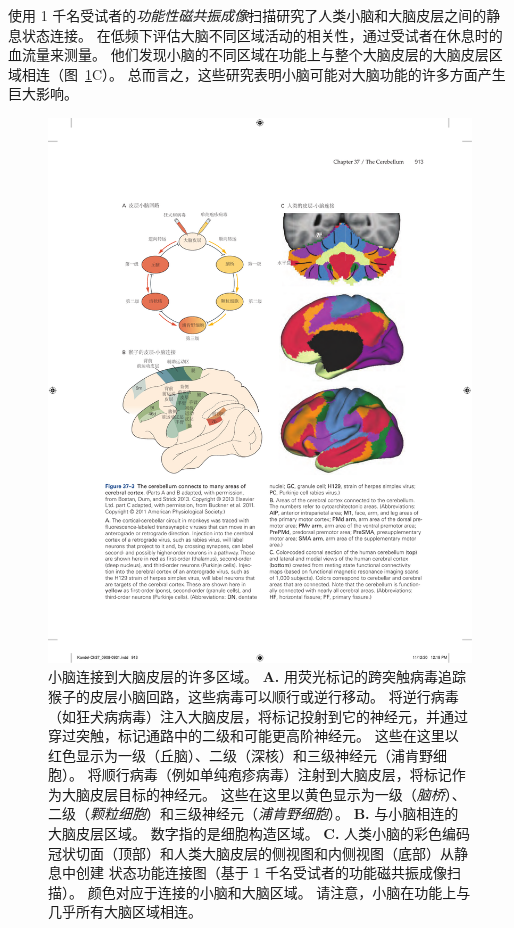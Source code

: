 使用 1 千名受试者的\textit{功能性磁共振成像}扫描研究了人类小脑和大脑皮层之间的静息状态连接。
在低频下评估大脑不同区域活动的相关性，通过受试者在休息时的血流量来测量。
他们发现小脑的不同区域在功能上与整个大脑皮层的大脑皮层区域相连（图~\ref{fig:37_3}C）。
总而言之，这些研究表明小脑可能对大脑功能的许多方面产生巨大影响。


\begin{figure}[htbp]
	\centering
	\includegraphics[width=1.0\linewidth]{chap37/fig_37_3}
	\caption{小脑连接到大脑皮层的许多区域\cite{bostan2013cerebellar}。
		\textbf{A.} 用荧光标记的跨突触病毒追踪猴子的皮层小脑回路，这些病毒可以顺行或逆行移动。
		将逆行病毒（如狂犬病病毒）注入大脑皮层，将标记投射到它的神经元，并通过穿过突触，标记通路中的二级和可能更高阶神经元。
		这些在这里以红色显示为一级（丘脑）、二级（深核）和三级神经元（浦肯野细胞）。
		将顺行病毒（例如单纯疱疹病毒）注射到大脑皮层，将标记作为大脑皮层目标的神经元。
		这些在这里以黄色显示为一级（\textit{脑桥}）、二级（\textit{颗粒细胞}）和三级神经元（\textit{浦肯野细胞}）。
		\textbf{B.} 与小脑相连的大脑皮层区域。 数字指的是细胞构造区域。
		\textbf{C.} 人类小脑的彩色编码冠状切面（顶部）和人类大脑皮层的侧视图和内侧视图（底部）从静息中创建 状态功能连接图（基于 1 千名受试者的功能磁共振成像扫描）。
		颜色对应于连接的小脑和大脑区域。
		请注意，小脑在功能上与几乎所有大脑区域相连。}
	\label{fig:37_3}
\end{figure}



